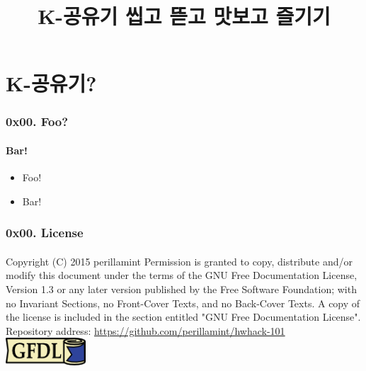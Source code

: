 \documentclass {beamer}
\title {K-공유기 씹고 뜯고 맛보고 즐기기}
\begin{document}
\begin{frame}
  \titlepage
\end{frame}

\section[Section]{K-공유기?}
\begin{frame}
  \frametitle{0x00. Foo?}
  \framesubtitle{Bar!}

  \begin{itemize}
  \item Foo!
  \item<2-> Bar!
  \end{itemize}
\end{frame}

\begin{frame}
  \frametitle{0x00. License}
  \framesubtitle{}
  Copyright (C)  2015 perillamint\linebreak
  Permission is granted to copy, distribute and/or modify this document
  under the terms of the GNU Free Documentation License, Version 1.3
  or any later version published by the Free Software Foundation;\linebreak
  with no Invariant Sections, no Front-Cover Texts, and no Back-Cover Texts.
  A copy of the license is included in the section entitled "GNU
  Free Documentation License".
  \linebreak
  \linebreak
  Repository address:\linebreak
  \url{https://github.com/perillamint/hwhack-101}
  \linebreak
  \linebreak
  \includegraphics [width=30mm]{img/gfdl-logo-small.png}
\end{frame}
\end{document}
